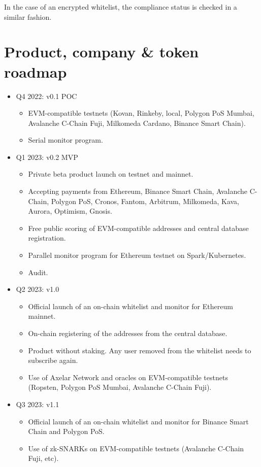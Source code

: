 ﻿\documentclass[a4paper]{article}
\begin{document}
In the case of an encrypted whitelist, the compliance status is checked in a similar fashion. 

\newpage
\section{Product, company \& token roadmap}

\begin{itemize}
\item
Q4 2022:  v0.1 POC
    \begin{itemize}
    \item EVM-compatible testnets (Kovan, Rinkeby, local, Polygon PoS Mumbai, Avalanche C-Chain Fuji, Milkomeda Cardano, Binance Smart Chain). 
    \item Serial monitor program. 
    \end{itemize}

\item
Q1 2023: v0.2 MVP
    \begin{itemize}
    \item Private beta product launch on testnet and mainnet.
    \item Accepting payments from Ethereum, Binance Smart Chain, Avalanche C-Chain, Polygon PoS, Cronos, Fantom, Arbitrum, Milkomeda, Kava, Aurora, Optimism, Gnosis. 
    \item Free public scoring of EVM-compatible addresses and central database registration.
    \item Parallel monitor program for Ethereum testnet on Spark/Kubernetes.
    \item Audit.
    \end{itemize}

\item
Q2 2023: v1.0
    \begin{itemize}
    \item Official launch of an on-chain whitelist and monitor for Ethereum mainnet.
    \item On-chain registering of the addresses from the central database.
    \item Product without staking. Any user removed from the whitelist needs to subscribe again.
    \item Use of Axelar Network and oracles on EVM-compatible testnets (Ropsten, Polygon PoS Mumbai, Avalanche C-Chain Fuji).
    \end{itemize}

\item
Q3 2023: v1.1
    \begin{itemize}
    \item Official launch of an on-chain whitelist and monitor for Binance Smart Chain and Polygon PoS.
    \item Use of zk-SNARKs on EVM-compatible testnets (Avalanche C-Chain Fuji, etc). 
    \end{itemize}


\end{itemize}
\end{document}
